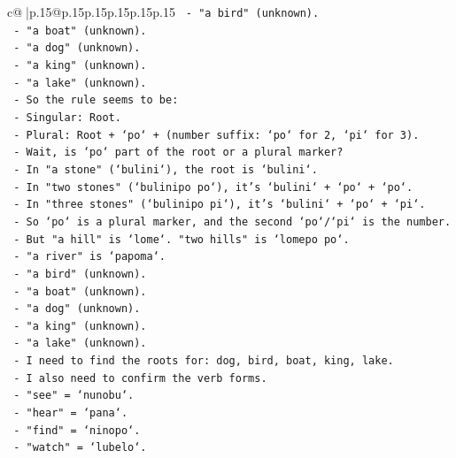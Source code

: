 \documentclass{article}
\begin{document}
{\begin{supertabular}{c@{$\;$}|p{.15\linewidth}@{}p{.15\linewidth}p{.15\linewidth}p{.15\linewidth}p{.15\linewidth}p{.15\linewidth}}
{{{\texttt{            {-} "a bird" (unknown).} \\
\texttt{            {-} "a boat" (unknown).} \\
\texttt{            {-} "a dog" (unknown).} \\
\texttt{            {-} "a king" (unknown).} \\
\texttt{            {-} "a lake" (unknown).} \\
\texttt{          {-} So the rule seems to be:} \\
\texttt{            {-} Singular: Root.} \\
\texttt{            {-} Plural: Root + `po` + (number suffix: `po` for 2, `pi` for 3).} \\
\texttt{            {-} Wait, is `po` part of the root or a plural marker?} \\
\texttt{            {-} In "a stone" (`bulini`), the root is `bulini`.} \\
\texttt{            {-} In "two stones" (`bulinipo po`), it's `bulini` + `po` + `po`.} \\
\texttt{            {-} In "three stones" (`bulinipo pi`), it's `bulini` + `po` + `pi`.} \\
\texttt{            {-} So `po` is a plural marker, and the second `po`/`pi` is the number.} \\
\texttt{            {-} But "a hill" is `lome`. "two hills" is `lomepo po`.} \\
\texttt{            {-} "a river" is `papoma`.} \\
\texttt{            {-} "a bird" (unknown).} \\
\texttt{            {-} "a boat" (unknown).} \\
\texttt{            {-} "a dog" (unknown).} \\
\texttt{            {-} "a king" (unknown).} \\
\texttt{            {-} "a lake" (unknown).} \\
\texttt{          {-} I need to find the roots for: dog, bird, boat, king, lake.} \\
\texttt{          {-} I also need to confirm the verb forms.} \\
\texttt{            {-} "see" = `nunobu`.} \\
\texttt{            {-} "hear" = `pana`.} \\
\texttt{            {-} "find" = `ninopo`.} \\
\texttt{            {-} "watch" = `lubelo`.} \\
}}}
\end{supertabular}}
\end{document}
